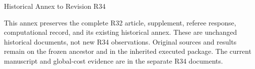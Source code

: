 \documentclass[11pt]{article}
\begin{document}
\begin{center}\Large Historical Annex to Revision R34\end{center}
This annex preserves the complete R32 article, supplement, referee response, computational record, and its existing historical annex. These are unchanged historical documents, not new R34 observations. Original sources and results remain on the frozen ancestor and in the inherited executed package. The current manuscript and global-cost evidence are in the separate R34 documents.\clearpage





\end{document}
